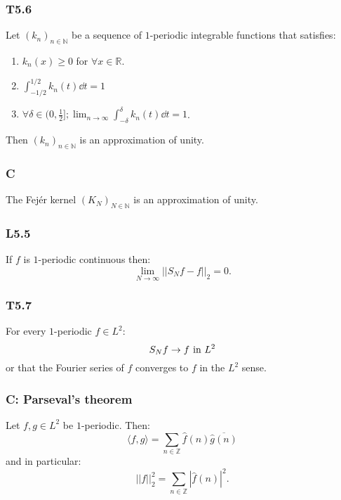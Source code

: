 \documentclass{article}
\begin{document}
\begin{multicols*}{3}
\subsubsection*{T5.6}
Let $(k_n)_{n\in\mathbb{N}}$ be
a sequence of $1$-periodic integrable functions
that satisfies:
\begin{enumerate}
    \item $k_n(x)\geq0$ for $\forall x\in\mathbb{R}$.
    
    \item $\displaystyle
    \int_{-1/2}^{1/2}k_n(t)\dd t=1$

    \item $\forall\delta\in(0,\frac{1}{2}];
    \displaystyle\lim_{n\rightarrow\infty}
    \int_{-\delta}^{\delta}k_n(t)\dd t=1$.
\end{enumerate}
Then $(k_n)_{n\in\mathbb{N}}$
is an approximation of unity.

\subsubsection*{C}
The Fej\'er kernel $(K_N)_{N\in\mathbb{N}}$
is an approximation of unity.

\subsubsection*{L5.5}
If $f$ is $1$-periodic continuous
then:
$$\lim_{N\rightarrow\infty}||S_N f-f||_2=0.$$

\subsubsection*{T5.7}
For every $1$-periodic $f\in L^2$:
$$S_N f\rightarrow f
\hspace{0.05in}\text{in $L^2$}$$
or that the Fourier series of $f$
converges to $f$ 
in the $L^2$ sense.

\subsubsection*{C: Parseval's theorem}
Let $f,g\in L^2$ be $1$-periodic. Then:
$$\langle f,g\rangle=
\sum_{n\in\mathbb{Z}}\widehat{f}(n)
\overline{\widehat{g}(n)}$$
and in particular:
$$||f||_2^2=\sum_{n\in\mathbb{Z}}
|\widehat{f}(n)|^2.$$

\end{multicols*}
\end{document}
